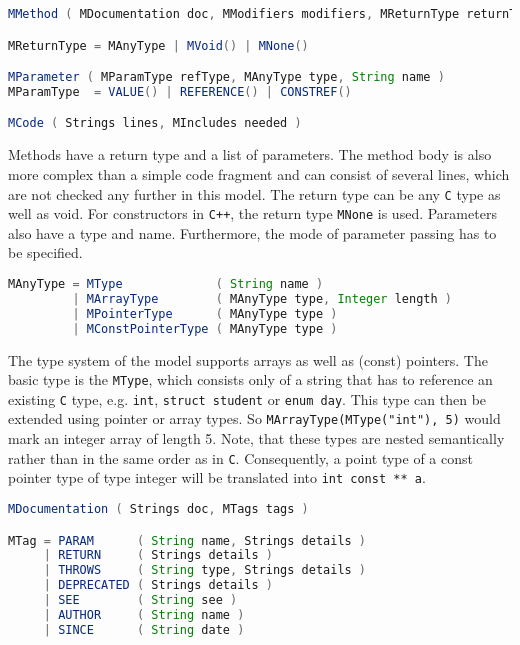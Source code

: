 \documentclass{report}
\begin{document}
\begin{lstlisting}[language=java, breaklines=true]
MMethod ( MDocumentation doc, MModifiers modifiers, MReturnType returnType, String name, MParameters parameter, MCode body )

MReturnType = MAnyType | MVoid() | MNone()

MParameter ( MParamType refType, MAnyType type, String name )
MParamType  = VALUE() | REFERENCE() | CONSTREF()

MCode ( Strings lines, MIncludes needed )
\end{lstlisting}

Methods have a return type and a list of parameters. The method body is also more complex than a simple code fragment and can consist of several lines, which are not checked any further in this model. The return type can be any \texttt{C} type as well as void. For constructors in \texttt{C++}, the return type \texttt{MNone} is used. Parameters also have a type and name. Furthermore, the mode of parameter passing has to be specified.

\begin{lstlisting}[language=java, breaklines=true]
MAnyType = MType             ( String name )
         | MArrayType        ( MAnyType type, Integer length )
         | MPointerType      ( MAnyType type )
         | MConstPointerType ( MAnyType type )
\end{lstlisting}

The type system of the model supports arrays as well as (const) pointers. The basic type is the \texttt{MType}, which consists only of a string that has to reference an existing \texttt{C} type, e.g. \texttt{int}, \texttt{struct student} or \texttt{enum day}. This type can then be extended using pointer or array types. So \texttt{MArrayType(MType("int"), 5)} would mark an integer array of length 5. Note, that these types are nested semantically rather than in the same order as in \texttt{C}. Consequently, a point type of a const pointer type of type integer will be translated into \texttt{int const ** a}.

\begin{lstlisting}[language=java, breaklines=true]
MDocumentation ( Strings doc, MTags tags )

MTag = PARAM      ( String name, Strings details )
     | RETURN     ( Strings details )
     | THROWS     ( String type, Strings details )
     | DEPRECATED ( Strings details ) 
     | SEE        ( String see )
     | AUTHOR     ( String name )
     | SINCE      ( String date )
\end{lstlisting}
\end{document}
